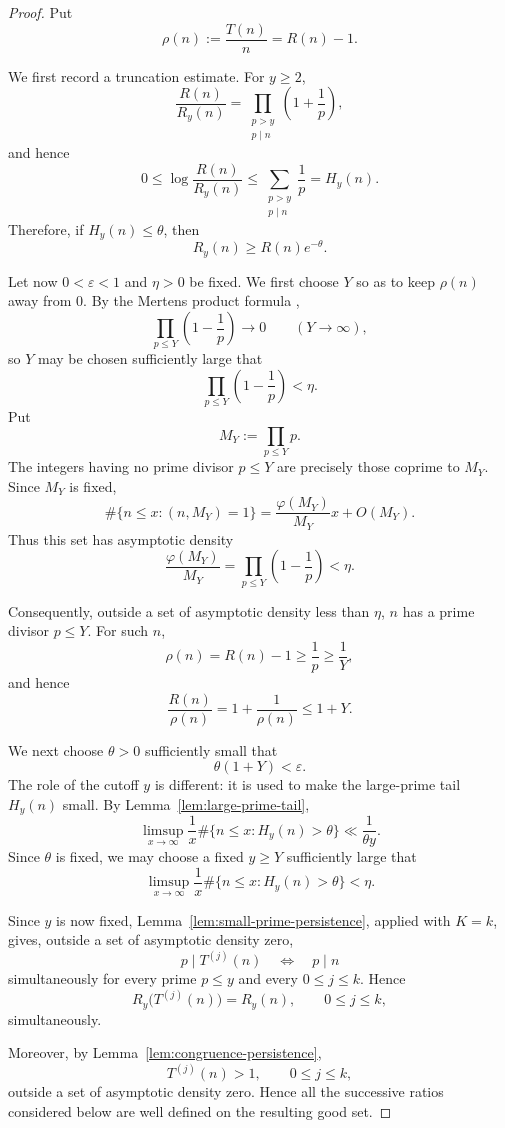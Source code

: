 \documentclass{article}
\begin{document}
\begin{proof}
Put
\[
\rho(n)
:=
\frac{T(n)}n
=
R(n)-1.
\]

We first record a truncation estimate. For $y\ge2$,
\[
\frac{R(n)}{R_y(n)}
=
\prod_{\substack{p>y\\p\mid n}}
\left(1+\frac1p\right),
\]
and hence
\[
0
\le
\log\frac{R(n)}{R_y(n)}
\le
\sum_{\substack{p>y\\p\mid n}}\frac1p
=
H_y(n).
\]
Therefore, if $H_y(n)\le\theta$, then
\[
R_y(n)\ge R(n)e^{-\theta}.
\]

Let now $0<\varepsilon<1$ and $\eta>0$ be fixed. We first choose
$Y$ so as to keep $\rho(n)$ away from $0$. By the Mertens product
formula \cite{ref9},
\[
\prod_{p\le Y}\left(1-\frac1p\right)\longrightarrow0
\qquad(Y\to\infty),
\]
so $Y$ may be chosen sufficiently large that
\[
\prod_{p\le Y}\left(1-\frac1p\right)<\eta.
\]
Put
\[
M_Y
:=
\prod_{p\le Y}p.
\]
The integers having no prime divisor $p\le Y$ are precisely those
coprime to $M_Y$. Since $M_Y$ is fixed,
\[
\#\{n\le x:(n,M_Y)=1\}
=
\frac{\varphi(M_Y)}{M_Y}x+O(M_Y).
\]
Thus this set has asymptotic density
\[
\frac{\varphi(M_Y)}{M_Y}
=
\prod_{p\le Y}\left(1-\frac1p\right)
<
\eta.
\]

Consequently, outside a set of asymptotic density less than $\eta$,
$n$ has a prime divisor $p\le Y$. For such $n$,
\[
\rho(n)
=
R(n)-1
\ge
\frac1p
\ge
\frac1Y,
\]
and hence
\[
\frac{R(n)}{\rho(n)}
=
1+\frac1{\rho(n)}
\le
1+Y.
\]

We next choose $\theta>0$ sufficiently small that
\[
\theta(1+Y)<\varepsilon.
\]
The role of the cutoff $y$ is different: it is used to make the
large-prime tail $H_y(n)$ small. By
Lemma~\ref{lem:large-prime-tail},
\[
\limsup_{x\to\infty}
\frac1x
\#\{n\le x:H_y(n)>\theta\}
\ll
\frac1{\theta y}.
\]
Since $\theta$ is fixed, we may choose a fixed $y\ge Y$ sufficiently
large that
\[
\limsup_{x\to\infty}
\frac1x
\#\{n\le x:H_y(n)>\theta\}
<
\eta.
\]

Since $y$ is now fixed,
Lemma~\ref{lem:small-prime-persistence}, applied with $K=k$, gives,
outside a set of asymptotic density zero,
\[
p\mid T^{(j)}(n)
\quad\Longleftrightarrow\quad
p\mid n
\]
simultaneously for every prime $p\le y$ and every
$0\le j\le k$. Hence
\[
R_y\bigl(T^{(j)}(n)\bigr)
=
R_y(n),
\qquad
0\le j\le k,
\]
simultaneously.

Moreover, by Lemma~\ref{lem:congruence-persistence},
\[
T^{(j)}(n)>1,
\qquad
0\le j\le k,
\]
outside a set of asymptotic density zero. Hence all the successive
ratios considered below are well defined on the resulting good set.


\end{proof}
\end{document}
